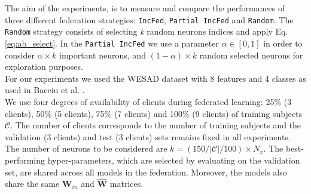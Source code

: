 The aim of the experiments, is to measure and compare the performances of three different federation strategies: \texttt{IncFed}, \texttt{Partial IncFed} and \texttt{Random}. The \texttt{Random} strategy consists of selecting \textit{k} random neurons indices and apply Eq. \ref{eq:ab_select}. In the \texttt{Partial IncFed} we use a parameter $\alpha\in[0,1]$ in order to consider $\alpha\times\textit{k}$ important neurons, and $(1-\alpha)\times\textit{k}$ random selected neurons for exploration purposes.\\

For our experiments we used the WESAD dataset with 8 features and 4 classes as used in Bacciu et al. \cite{bacciu2021federated}.\\

We use four degrees of availability of clients during federated learning: 25\% (3 clients), 50\% (5 clients), 75\% (7 clients) and 100\% (9 clients) of training subjects $\mathcal{C}$. The number of clients corresponds to the number of training subjects and the validation (3 clients) and test (3 clients) sets remains fixed in all experiments. The number of neurons to be considered are $k=(150/\left|\mathcal{C}\right|/100)\times N_x$. The best-performing hyper-parameters, which are selected by evaluating on the validation set, are shared across all models in the federation. Moreover, the models also share the same $\textbf{W}_{in}$ and $\widehat{\textbf{W}}$ matrices.\\

